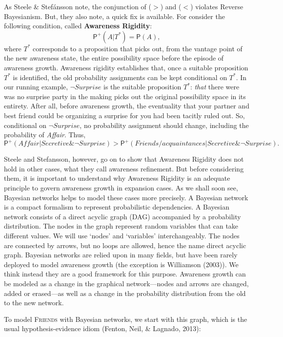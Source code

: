 \documentclass[
  11pt,
  dvipsnames,enabledeprecatedfontcommands]{scrartcl}
\newcommand{\pr}[1]{\ensuremath{\mathsf{P}(#1)}}
\newcommand{\ppr}[2]{\ensuremath{\mathsf{P}^{#1}(#2)}}
\begin{document}
As Steele \& Stefánsson note, the conjunction of (\(>\)) and (\(<\))
violates Reverse Bayesianism. But, they also note, a quick fix is
available. For consider the following condition, called
\textbf{Awareness Rigidity}: \[\ppr{+}{A \vert T^*}=\pr{A},\] where
\(T^*\) corresponds to a proposition that picks out, from the vantage
point of the new awareness state, the entire possibility space before
the episode of awareness growth. Awareness rigidity establishes that,
once a suitable proposition \(T^*\) is identified, the old probability
assignments can be kept conditional on \(T^*\). In our running example,
\(\neg\textit{Surprise}\) is the suitable proposition \(T^*\):
\emph{that} there were was no surprise party in the making picks out the
original possibility space in its entirety. After all, before awareness
growth, the eventuality that your partner and best friend could be
organizing a surprise for you had been tacitly ruled out. So,
conditional on \(\neg\textit{Surprise}\), no probability assignment
should change, including the probability of \textit{Affair}. Thus,
\[\ppr{+}{\textit{Affair} \vert  \textit{Secretive} \& \neg\textit{Surprise} } > \ppr{+}{\textit{Friends/acquaintances} \vert \textit{Secretive} \& \neg\textit{Surprise}}. \]

Steele and Stefansson, however, go on to show that Awareness Rigidity
does not hold in other cases, what they call awareness refinement. But
before considering them, it is important to understand why Awareness
Rigidity is an adequate principle to govern awareness growth in
expansion cases. As we shall soon see, Bayesian networks helps to model
these cases more precisely. A Bayesian network is a compact formalism to
represent probabilistic dependencies. A Bayesian network consists of a
direct acyclic graph (DAG) accompanied by a probability distribution.
The nodes in the graph represent random variables that can take
different values. We will use `nodes' and `variables' interchangeably.
The nodes are connected by arrows, but no loops are allowed, hence the
name direct acyclic graph. Bayesian networks are relied upon in many
fields, but have been rarely deployed to model awareness growth (the
exception is Williamson (2003)). We think instead they are a good
framework for this purpose. Awareness growth can be modeled as a change
in the graphical network---nodes and arrows are changed, added or
erased---as well as a change in the probability distribution from the
old to the new network.

To model \textsc{Friends} with Bayesian networks, we start with this
graph, which is the usual hypothesis-evidence idiom (Fenton, Neil, \&
Lagnado, 2013):
\end{document}
